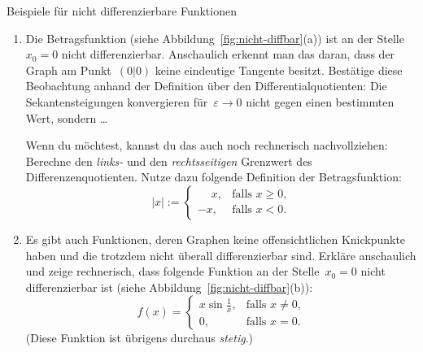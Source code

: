 \documentclass{zirkelblatt}
\theoremstyle{definition}
\theoremstyle{plain}
\theoremstyle{remark}
\begin{document}
\begin{aufgabeShaded}{Beispiele für nicht differenzierbare Funktionen}
\label{aufg:nichtdb}
\begin{enumerate}
\item Die Betragsfunktion (siehe Abbildung~\ref{fig:nicht-diffbar}(a)) ist an der
Stelle~$x_0 = 0$ nicht differenzierbar. Anschaulich erkennt man das daran, dass
der Graph am Punkt~$(0|0)$ keine eindeutige Tangente besitzt.\footnotemark{}
Bestätige diese Beobachtung anhand der Definition über den
Differentialquotienten: Die Sekantensteigungen konvergieren für~$\varepsilon
\to 0$ nicht gegen einen bestimmten Wert, sondern \ldots

Wenn du möchtest, kannst du das auch noch rechnerisch nachvollziehen: Berechne
den \emph{links-} und den \emph{rechtsseitigen} Grenzwert des
Differenzenquotienten. Nutze dazu folgende Definition der Betragsfunktion:
\[ |x| := \begin{cases}\phantom{-}x, & \text{falls $x \geq 0$,} \\ -x, & \text{falls $x <
0$.}\end{cases} \]
\item Es gibt auch Funktionen, deren Graphen keine offensichtlichen
Knickpunkte haben und die trotzdem nicht überall differenzierbar sind. Erkläre
anschaulich und zeige rechnerisch, dass folgende Funktion an der Stelle~$x_0 =
0$ nicht differenzierbar ist (siehe Abbildung~\ref{fig:nicht-diffbar}(b)):
\[ f(x) = \begin{cases}x \sin\frac{1}{x}, & \text{falls $x \neq 0$,} \\
0, & \text{falls $x = 0$.}\end{cases} \]
(Diese Funktion ist übrigens durchaus \emph{stetig}.)
\end{enumerate}
\end{aufgabeShaded}
\end{document}
